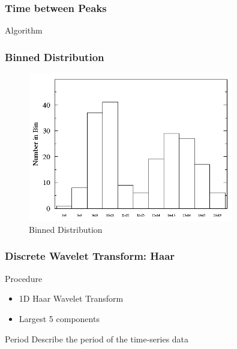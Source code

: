 \documentclass[11pt,slidestop,mathserif,compress]{beamer}
\begin{document}
\begin{frame}[shrink]
	\frametitle{Time between Peaks}
	\begin{exampleblock}{Algorithm}
		\begin{algorithm}[H]
			\caption{Peak Detection Algorithm that uses Peak Function F}
			\DontPrintSemicolon
			\BlankLine
		\end{algorithm}
	\end{exampleblock}
\end{frame}

\begin{frame}
	\frametitle{Binned Distribution}
	\begin{figure}[H]
		\centering
		\includegraphics[width=0.8\textwidth]{D.png}
		\caption{Binned Distribution}
	\end{figure}
\end{frame}

\begin{frame}
	\frametitle{Discrete Wavelet Transform: Haar}
	\begin{block}{Procedure}
		\begin{itemize}
			\item	1D Haar Wavelet Transform
			\item	Largest 5 components
		\end{itemize}
	\end{block}
	
	\pause
	\begin{exampleblock}{Period}
		Describe the period of the time-series data
	\end{exampleblock}

\end{frame}
\end{document}
